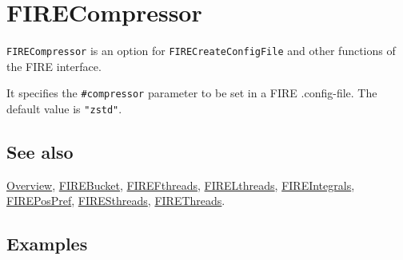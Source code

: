 \documentclass[../FeynHelpersManual.tex]{subfiles}
\begin{document}
\hypertarget{firecompressor}{
\section{FIRECompressor}\label{firecompressor}}

\texttt{FIRECompressor} is an option for \texttt{FIRECreateConfigFile}
and other functions of the FIRE interface.

It specifies the \texttt{\#{}\allowbreak{}compressor} parameter to be
set in a FIRE .config-file. The default value is \texttt{"zstd"}.

\subsection{See also}

\hyperlink{toc}{Overview}, \hyperlink{firebucket}{FIREBucket},
\hyperlink{firefthreads}{FIREFthreads},
\hyperlink{firelthreads}{FIRELthreads},
\hyperlink{fireintegrals}{FIREIntegrals},
\hyperlink{firepospref}{FIREPosPref},
\hyperlink{firesthreads}{FIRESthreads},
\hyperlink{firethreads}{FIREThreads}.

\subsection{Examples}
\end{document}
